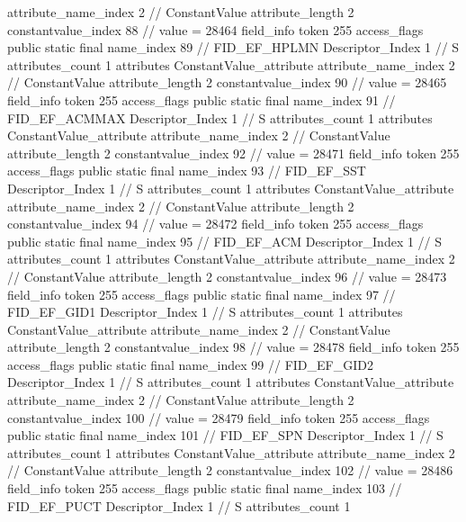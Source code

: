 {{{{{{{					attribute_name_index	2		// ConstantValue
					attribute_length	2
					constantvalue_index	88		// value = 28464
				}
				}
			}
			field_info {
				token	255
				access_flags	public static final
				name_index	89		// FID_EF_HPLMN
				Descriptor_Index	1		// S
				attributes_count	1
				attributes {
				ConstantValue_attribute {
					attribute_name_index	2		// ConstantValue
					attribute_length	2
					constantvalue_index	90		// value = 28465
				}
				}
			}
			field_info {
				token	255
				access_flags	public static final
				name_index	91		// FID_EF_ACMMAX
				Descriptor_Index	1		// S
				attributes_count	1
				attributes {
				ConstantValue_attribute {
					attribute_name_index	2		// ConstantValue
					attribute_length	2
					constantvalue_index	92		// value = 28471
				}
				}
			}
			field_info {
				token	255
				access_flags	public static final
				name_index	93		// FID_EF_SST
				Descriptor_Index	1		// S
				attributes_count	1
				attributes {
				ConstantValue_attribute {
					attribute_name_index	2		// ConstantValue
					attribute_length	2
					constantvalue_index	94		// value = 28472
				}
				}
			}
			field_info {
				token	255
				access_flags	public static final
				name_index	95		// FID_EF_ACM
				Descriptor_Index	1		// S
				attributes_count	1
				attributes {
				ConstantValue_attribute {
					attribute_name_index	2		// ConstantValue
					attribute_length	2
					constantvalue_index	96		// value = 28473
				}
				}
			}
			field_info {
				token	255
				access_flags	public static final
				name_index	97		// FID_EF_GID1
				Descriptor_Index	1		// S
				attributes_count	1
				attributes {
				ConstantValue_attribute {
					attribute_name_index	2		// ConstantValue
					attribute_length	2
					constantvalue_index	98		// value = 28478
				}
				}
			}
			field_info {
				token	255
				access_flags	public static final
				name_index	99		// FID_EF_GID2
				Descriptor_Index	1		// S
				attributes_count	1
				attributes {
				ConstantValue_attribute {
					attribute_name_index	2		// ConstantValue
					attribute_length	2
					constantvalue_index	100		// value = 28479
				}
				}
			}
			field_info {
				token	255
				access_flags	public static final
				name_index	101		// FID_EF_SPN
				Descriptor_Index	1		// S
				attributes_count	1
				attributes {
				ConstantValue_attribute {
					attribute_name_index	2		// ConstantValue
					attribute_length	2
					constantvalue_index	102		// value = 28486
				}
				}
			}
			field_info {
				token	255
				access_flags	public static final
				name_index	103		// FID_EF_PUCT
				Descriptor_Index	1		// S
				attributes_count	1
}}}}}
